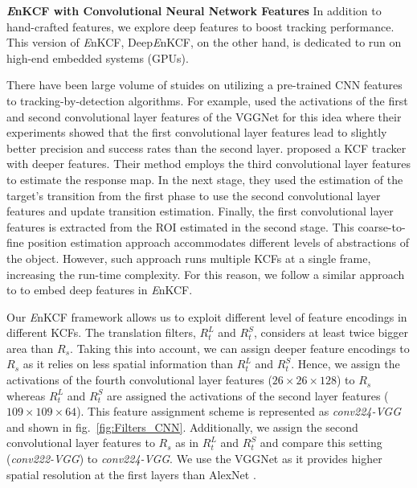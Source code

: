 \documentclass[10pt,twocolumn,letterpaper]{article}
\begin{document}
\textbf{{\it E}nKCF with Convolutional Neural Network Features}
In addition to hand-crafted features, we explore deep features
to boost tracking performance. This version of {\it E}nKCF, Deep{\it E}nKCF, on the other hand, 
is dedicated to run on high-end embedded systems (GPUs). 

There have been large volume of stuides on utilizing a pre-trained CNN features to
tracking-by-detection algorithms. For example,
\cite{danelljan2015convolutional} used the activations of the first
and second convolutional layer features of the VGGNet
\cite{simonyan2014very} for this idea where their experiments showed
that the first convolutional layer features lead to slightly better
precision and success rates than the second
layer. \cite{ma2015hierarchical} proposed a KCF tracker with deeper
features. Their method employs the third convolutional layer features
to estimate the response map. In the next stage, they used the estimation
of the target's transition from the first phase to use the second
convolutional layer features and update transition estimation. 
Finally, the first convolutional layer features is extracted from the ROI estimated 
in the second stage. This coarse-to-fine position estimation approach accommodates
different levels of abstractions of the object. However, such
approach runs multiple KCFs at a single frame, increasing
the run-time complexity. For this reason, we follow a similar approach
to \cite{danelljan2015convolutional} to embed deep features in {\it E}nKCF.

Our {\it E}nKCF framework allows us to exploit different
level of feature encodings in different KCFs. The translation filters,
$R_{t}^{L}$ and $R_{t}^{S}$, considers at least twice bigger area
than $R_{s}$. Taking this into account, we can assign deeper feature
encodings to $R_{s}$ as it relies on less spatial information than
$R_{t}^{L}$ and $R_{t}^{S}$. Hence, we assign the activations of the
fourth convolutional layer features ($26\times26\times128$) to $R_{s}$
whereas $R_{t}^{L}$ and $R_{t}^{S}$ are assigned the activations of
the second layer features ($109\times109\times64$). This feature
assignment scheme is represented as \textit{conv224-VGG} and shown in
fig.~\ref{fig:Filters_CNN}. Additionally, we assign the second
convolutional layer features to $R_{s}$ as in $R_{t}^{L}$ and
$R_{t}^{S}$ and compare this setting (\textit{conv222-VGG}) to
\textit{conv224-VGG}. We use the VGGNet as it provides higher spatial
resolution at the first layers than AlexNet
\cite{krizhevsky2012imagenet}.
\end{document}
